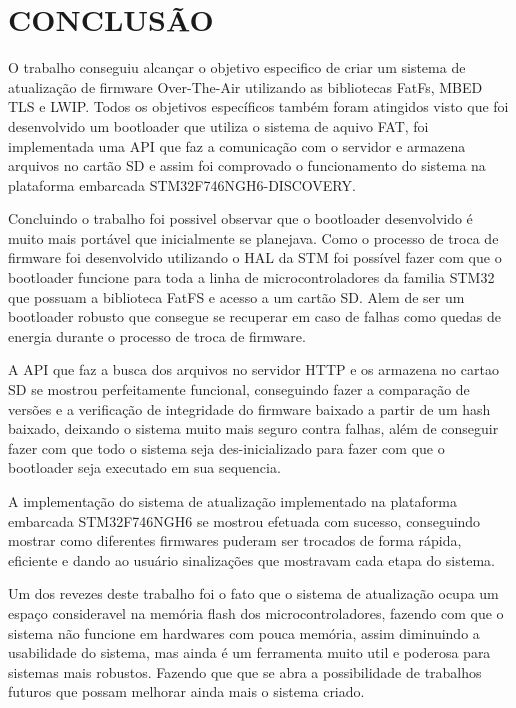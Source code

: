 
\chapter{CONCLUSÃO}
\label{chap:conclusao}
O trabalho conseguiu alcançar o objetivo especifico de criar um sistema de atualização de firmware Over-The-Air utilizando as bibliotecas FatFs, MBED TLS e LWIP. Todos os objetivos específicos também foram atingidos visto que foi desenvolvido um bootloader que utiliza o sistema de aquivo FAT, foi implementada uma API que faz a comunicação com o servidor e armazena arquivos no cartão SD e assim foi comprovado o funcionamento do sistema na plataforma embarcada STM32F746NGH6-DISCOVERY.

Concluindo o trabalho foi possivel observar que o bootloader desenvolvido é muito mais portável que inicialmente se planejava. Como o processo de troca de firmware foi desenvolvido utilizando o HAL da STM foi possível fazer com que o bootloader funcione para toda a linha de microcontroladores da familia STM32 que possuam a biblioteca FatFS e acesso a um cartão SD. Alem de ser um bootloader robusto que consegue se recuperar em caso de falhas como quedas de energia durante o processo de troca de firmware.

A API que faz a busca dos arquivos no servidor HTTP e os armazena no cartao SD se mostrou perfeitamente funcional, conseguindo fazer a comparação de versões e a verificação de integridade do firmware baixado a partir de um hash baixado, deixando o sistema muito mais seguro contra falhas, além de conseguir fazer com que todo o sistema seja des-inicializado para fazer com que o bootloader seja executado em sua sequencia.

A implementação do sistema de atualização implementado na plataforma embarcada STM32F746NGH6 se mostrou efetuada com sucesso, conseguindo mostrar como diferentes firmwares puderam ser trocados de forma rápida, eficiente e dando ao usuário sinalizações que mostravam cada etapa do sistema.

Um dos revezes deste trabalho foi o fato que o sistema de atualização ocupa um espaço consideravel na memória flash dos microcontroladores, fazendo com que o sistema não funcione em hardwares com pouca memória, assim diminuindo a usabilidade do sistema, mas ainda é um ferramenta muito util e poderosa para sistemas mais robustos. Fazendo que que se abra a possibilidade de trabalhos futuros que possam melhorar ainda mais o sistema criado.
